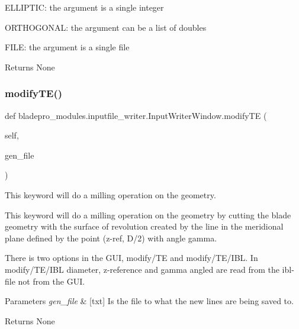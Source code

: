 \begin{DoxyItemize}
\item {\ttfamily E\+L\+L\+I\+P\+T\+IC\+:} the argument is a single integer \item {\ttfamily O\+R\+T\+H\+O\+G\+O\+N\+AL\+:} the argument can be a list of doubles \item {\ttfamily F\+I\+LE\+:} the argument is a single file\end{DoxyItemize}
\begin{DoxyReturn}{Returns}
None 
\end{DoxyReturn}
\hypertarget{a00070_a52d4edd27f78b5559e6e3683c6adb3bc}{}\label{a00070_a52d4edd27f78b5559e6e3683c6adb3bc} 
\subsubsection{\texorpdfstring{modify\+T\+E()}{modifyTE()}}
{\footnotesize\ttfamily def bladepro\+\_\+modules.\+inputfile\+\_\+writer.\+Input\+Writer\+Window.\+modify\+TE (\begin{DoxyParamCaption}\item[{}]{self,  }\item[{}]{gen\+\_\+file }\end{DoxyParamCaption})}



This keyword will do a milling operation on the geometry. 

This keyword will do a milling operation on the geometry by cutting the blade geometry with the surface of revolution created by the line in the meridional plane defined by the point (z-\/ref, D/2) with angle gamma.

There is two options in the G\+UI, modify/\+TE and modify/\+T\+E/\+I\+BL. In modify/\+T\+E/\+I\+BL diameter, z-\/reference and gamma angled are read from the ibl-\/file not from the G\+UI.


\begin{DoxyParams}{Parameters}
{\em gen\+\_\+file} & \mbox{[}txt\mbox{]} Is the file to what the new lines are being saved to. \\
\hline
\end{DoxyParams}
\begin{DoxyReturn}{Returns}
None 
\end{DoxyReturn}
\hypertarget{a00070_a0894116159595156b62859c796bdea1d}{}\label{a00070_a0894116159595156b62859c796bdea1d} 
